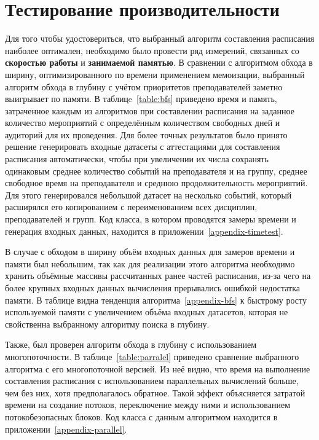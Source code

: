 \section{Тестирование производительности} \label{ch4:sec3}
Для того чтобы удостовериться, что выбранный алгоритм составления расписания наиболее оптимален, необходимо было провести ряд измерений, связанных со \textbf{скоростью работы} и \textbf{занимаемой памятью}. В сравнении с алгоритмом обхода в ширину, оптимизированного по времени применением мемоизации, выбранный алгоритм обхода в глубину с учётом приоритетов преподавателей заметно выигрывает по памяти. В таблицe~\ref{table:bfs} приведено время и память, затраченное каждым из алгоритмов при составлении расписания на заданное количество мероприятий с определённым количеством свободных дней и аудиторий для их проведения. Для более точных результатов было принято решение генерировать входные датасеты с аттестациями для составления расписания автоматически, чтобы при увеличении их числа сохранять одинаковым среднее количество событий на преподавателя и на группу, среднее свободное время на преподавателя и среднюю продолжительность мероприятий. Для этого генерировался небольшой датасет на несколько событий, который расширялся его копированием с переименованием всех дисциплин, преподавателей и групп. Код класса, в котором проводятся замеры времени и генерация входных данных, находится в приложении~\ref{appendix-timetest}.

В случае с обходом в ширину объём входных данных для замеров времени и памяти был небольшим, так как для реализации этого алгоритма необходимо хранить объёмные массивы рассчитанных ранее частей расписания, из-за чего на более крупных входных данных вычисления прерывались ошибкой недостатка памяти. В таблице видна тенденция алгоритма~\ref{appendix-bfs} к быстрому росту используемой памяти с увеличением объёма входных датасетов, которая не свойственна выбранному алгоритму поиска в глубину.

Также, был проверен алгоритм обхода в глубину с использованием многопоточности. В таблице~\ref{table:parralel} приведено сравнение выбранного алгоритма с его многопоточной версией. Из неё видно, что время на выполнение составления расписания с использованием параллельных вычислений больше, чем без них, хотя предполагалось обратное. Такой эффект объясняется затратой времени на создание потоков, переключение между ними и использованием потокобезопасных блоков. Код класса с данным алгоритмом находится в приложении~\ref{appendix-parallel}.

